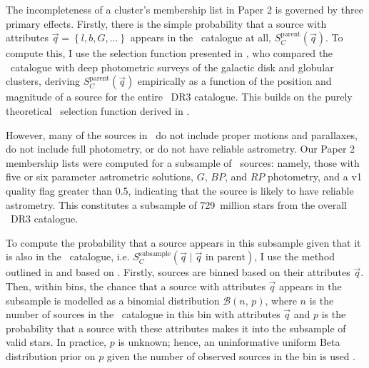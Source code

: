 The incompleteness of a cluster's membership list in Paper 2 is governed by three primary effects. Firstly, there is the simple probability that a source with attributes $\vec{q}=\left\{ l,b,G,... \right\}$ appears in the \gaia\ catalogue at all, $S_C^\text{parent}(\vec{q})$. To compute this, I use the selection function presented in \cite{cantat-gaudin_empirical_model_2023}, who compared the \gaia\ catalogue with deep photometric surveys of the galactic disk and globular clusters, deriving $S_C^\text{parent}(\vec{q})$ empirically as a function of the position and magnitude of a source for the entire \gaia\ DR3 catalogue. This builds on the purely theoretical \gaia\ selection function derived in \cite{boubert_completeness_2020,boubert_completeness_2020-1}. 

However, many of the sources in \gaia\ do not include proper motions and parallaxes, do not include full photometry, or do not have reliable astrometry. Our Paper 2 membership lists were computed for a subsample of \gaia\ sources: namely, those with five or six parameter astrometric solutions, $G$, $BP$, and $RP$ photometry, and a \cite{rybizki_classifier_2022} v1 quality flag greater than 0.5, indicating that the source is likely to have reliable astrometry. This constitutes a subsample of 729~million stars from the overall \gaia\ DR3 catalogue.

To compute the probability that a source appears in this subsample given that it is also in the \gaia\ catalogue, i.e. $S_C^\text{subsample}(\vec{q} \mid \vec{q}\text{ in parent})$, I use the method outlined in \cite{castro-ginard_estimating_selection_2023} and based on \cite{rix_selection_functions_2021}. Firstly, sources are binned based on their attributes $\vec{q}$. Then, within bins, the chance that a source with attributes $\vec{q}$ appears in the subsample is modelled as a binomial distribution $\mathcal{B}(n,\,p)$, where $n$ is the number of sources in the \gaia\ catalogue in this bin with attributes $\vec{q}$ and $p$ is the probability that a source with these attributes makes it into the subsample of valid stars. In practice, $p$ is unknown; hence, an uninformative uniform Beta distribution prior on $p$ given the number of observed sources in the bin is used \citep[see ][for full methodology]{castro-ginard_estimating_selection_2023}.

